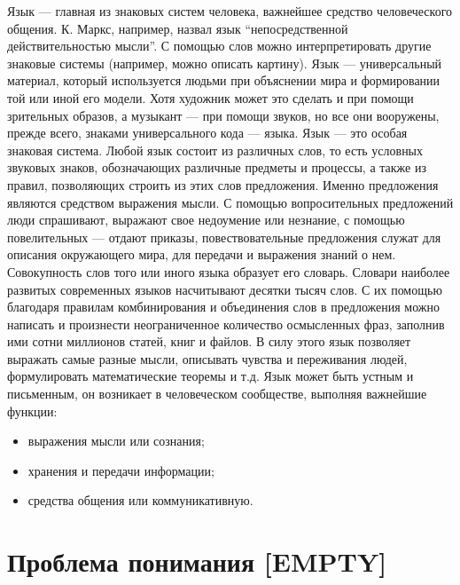 \documentclass[12pt]{article}
\begin{document}
Язык --- главная из знаковых систем человека, важнейшее средство человеческого общения. К. Маркс, например,
назвал язык “непосредственной действительностью мысли”. С помощью слов можно интерпретировать другие
знаковые системы (например, можно описать картину). Язык --- универсальный материал, который используется
людьми при объяснении мира и формировании той или иной его модели. Хотя художник может это сделать и
при помощи зрительных образов, а музыкант --- при помощи звуков, но все они вооружены, прежде всего,
знаками универсального кода --- языка. 
Язык --- это особая знаковая система. Любой язык состоит из различных слов, то есть условных звуковых знаков,
обозначающих  различные  предметы  и  процессы,  а  также  из  правил,  позволяющих  строить  из  этих  слов
предложения.  Именно  предложения  являются  средством  выражения  мысли.  С  помощью  вопросительных
предложений люди спрашивают, выражают свое недоумение или незнание, с помощью повелительных --- отдают
приказы, повествовательные предложения служат для описания окружающего мира, для передачи и выражения
знаний о нем. Совокупность слов того или иного языка образует его словарь. Словари наиболее развитых
современных языков насчитывают десятки тысяч слов. С их помощью благодаря правилам комбинирования и
объединения слов в предложения можно написать и произнести  неограниченное количество осмысленных
фраз, заполнив ими сотни миллионов статей, книг и файлов. В силу этого язык позволяет выражать самые
разные мысли, описывать чувства и переживания людей, формулировать математические теоремы и т.д.
Язык может быть устным и письменным, он возникает в человеческом сообществе, выполняя  важнейшие
функции:
\begin{itemize}
  \item выражения  мысли  или  сознания;
  \item хранения  и  передачи  информации;
  \item средства  общения  или
коммуникативную.
\end{itemize}

\newpage
\section{Проблема понимания [EMPTY]}
\end{document}
